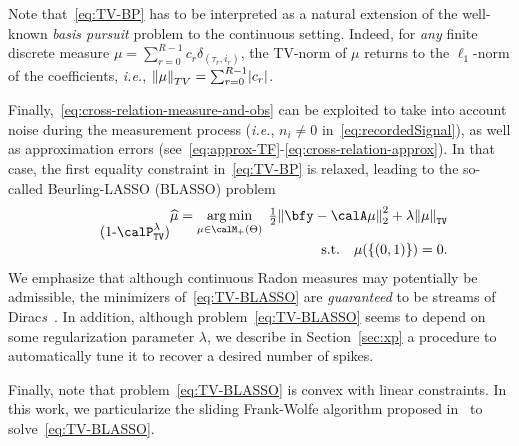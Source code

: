 Note that~\eqref{eq:TV-BP} has to be interpreted as a natural extension of the well-known \emph{basis pursuit} problem to the continuous setting.
Indeed, for \emph{any} finite discrete measure $\mu = \sum_{r=0}^{R-1} c_r\delta_{(\tau_r, i_r)}$, the TV-norm of $\mu$ returns to the $\ell_1$-norm of the coefficients, \textit{i.e.}, $\kvvbar{\mu}_{TV} = \sum_{r=0}^{R-1} \kvbar{c_r}$.

Finally,~\eqref{eq:cross-relation-measure-and-obs} can be exploited to take into account noise during the measurement process (\textit{i.e.},  $n_i\neq0$ in~\eqref{eq:recordedSignal}), as well as approximation errors  (see~\eqref{eq:approx-TF}-\eqref{eq:cross-relation-approx}).
In that case, the first equality constraint in~\eqref{eq:TV-BP} is relaxed, leading to the so-called Beurling-LASSO (BLASSO) problem
\begin{equation}
    \stepcounter{equation}
    \tag{\theequation-$\calP^\lambda_{\text{\texttt{TV}}}$}
    \label{eq:TV-BLASSO}
    \begin{split}
    \widehat{\mu}
    =
    \kargmin_{\mu \in\posDisRadonMeasure}
    \;
    \tfrac{1}{2} \kvvbar{
        \bfy - \opObs\mu
    }_2^2
    +
    \lambda\normTV{
        \mu
    }
    \\
    \quad
    \text{s.t.}
    \quad
    \mu(\{(0, 1)\}) = 0
    .
    \end{split}
\end{equation}
We emphasize that although continuous Radon measures may potentially be admissible, the minimizers of~\eqref{eq:TV-BLASSO} are \emph{guaranteed} to be streams of Dirac\textit{s}~\cite[Theorem~4.2]{bredies2018sparsity}.
In addition, although problem~\eqref{eq:TV-BLASSO} seems to depend on some regularization parameter $\lambda$, we describe in Section~\ref{sec:xp} a procedure to automatically tune it to recover a desired number of spikes.

Finally, note that problem~\eqref{eq:TV-BLASSO} is convex with linear constraints.
In this work, we particularize the sliding Frank-Wolfe algorithm proposed in~\cite{denoyelle2019} to solve~\eqref{eq:TV-BLASSO}.

